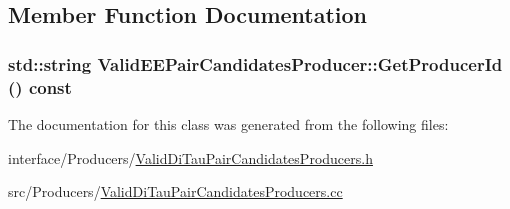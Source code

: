 \subsection{Member Function Documentation}
\hypertarget{classValidEEPairCandidatesProducer_a0d6dc5d1ed1642937ae8125603856c8d}{
\subsubsection[{GetProducerId}]{\setlength{\rightskip}{0pt plus 5cm}std::string ValidEEPairCandidatesProducer::GetProducerId () const}}
\label{classValidEEPairCandidatesProducer_a0d6dc5d1ed1642937ae8125603856c8d}


The documentation for this class was generated from the following files:\begin{DoxyCompactItemize}
\item 
interface/Producers/\hyperlink{ValidDiTauPairCandidatesProducers_8h}{ValidDiTauPairCandidatesProducers.h}\item 
src/Producers/\hyperlink{ValidDiTauPairCandidatesProducers_8cc}{ValidDiTauPairCandidatesProducers.cc}\end{DoxyCompactItemize}
